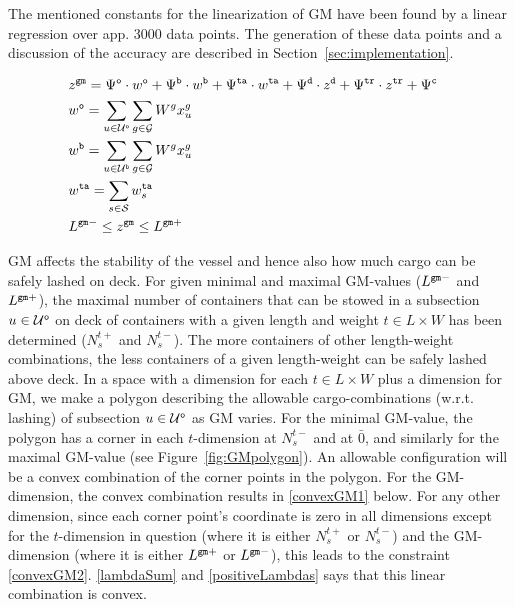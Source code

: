 The mentioned constants for the linearization of GM have been found by a linear regression over app. 3000 data points. %
The generation of these data points and a discussion of the accuracy are described in Section~\ref{sec:implementation}. 

\begin{alignat}{3}    
&z^{\ttt{gm}} = \Psi^{\ttt{o}}\cdot w^\ttt{o} + \Psi^{\ttt{b}}\cdot w^\ttt{b} + \Psi^{\ttt{ta}} \cdot w^\ttt{ta}
+ \Psi^{\ttt{d}} \cdot z^{\ttt{d}} + \Psi^{\ttt{tr}} \cdot z^{\ttt{tr}} + \Psi^{\ttt{c}}\quad			\label{defGM}\\
%
&w^\ttt{o} = \sum_{u\in \mc{U}^\ttt{o}}\sum_{g\in \mc{G}} W^g x^{g}_{u}	 													\label{defWo} \\
&w^\ttt{b} = \sum_{u\in \mc{U}^\ttt{b}}\sum_{g\in \mc{G}} W^g x^{g}_{u} 													\label{defWu} \\
%
&w^\ttt{ta} = \sum_{s\in\mc{S}} w^{\ttt{ta}}_{s} 																									\label{defWT} \\
%
&L^{\ttt{gm}-} \leq z^{\ttt{gm}}	\leq L^{\ttt{gm}+}																							\label{minGM}
\end{alignat}    

GM affects the stability of the vessel and hence also how much cargo can be safely lashed on deck. For given minimal and maximal GM-values ($L^{\texttt{gm}-}$ and $L^{\texttt{gm}+}$), the maximal number of containers that can be stowed in a subsection $u\in \mathcal{U}^\texttt{o}$ on deck of containers with a given length and weight $t\in L\times W$ has been determined ($N^{t+}_{s}$ and $N^{t-}_{s}$). The more containers of other length-weight combinations, the less containers of a given length-weight can be safely lashed above deck. 
In a space with a dimension for each $t\in L\times W$ plus a dimension for GM, we make a polygon describing the allowable cargo-combinations (w.r.t. lashing) of subsection $u\in\mathcal{U}^\texttt{o}$ as GM varies. For the minimal GM-value, the polygon has a corner in each $t$-dimension at $N^{t-}_{s}$ and at $\bar{0}$, and similarly for the maximal GM-value (see Figure~\ref{fig:GMpolygon}). %
An allowable configuration will be a convex combination of the corner points in the polygon. %
For the GM-dimension, the convex combination results in \eqref{convexGM1} below. For any other dimension, since each corner point's coordinate is zero in all dimensions except for the $t$-dimension in question (where it is either $N^{t+}_{s}$ or $N^{t-}_{s}$) and the GM-dimension (where it is either $L^{\texttt{gm}+}$ or $L^{\texttt{gm}-}$), this leads to the constraint \eqref{convexGM2}.  \eqref{lambdaSum} and \eqref{positiveLambdas} says that this linear combination is convex. 

